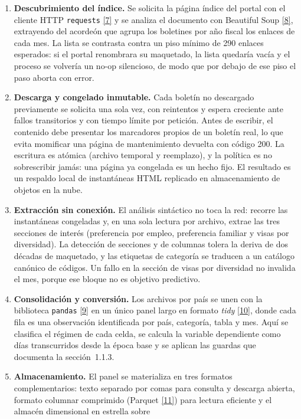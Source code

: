 \documentclass[12pt,letterpaper]{report}
\newcommand{\cita}[1]{\hyperref[bib:#1]{[#1]}}
\begin{document}
\begin{enumerate}[leftmargin=*]
\item \textbf{Descubrimiento del índice.} Se solicita la página índice del portal con el
cliente HTTP \texttt{requests} \cita{7} y se analiza el documento con Beautiful Soup
\cita{8}, extrayendo del acordeón que agrupa los boletines por año fiscal los enlaces de
cada mes. La lista se contrasta contra un piso mínimo de 290 enlaces esperados: si el portal
renombrara su maquetado, la lista quedaría vacía y el proceso se volvería un no-op
silencioso, de modo que por debajo de ese piso el paso aborta con error.
\item \textbf{Descarga y congelado inmutable.} Cada boletín no descargado previamente se
solicita una sola vez, con reintentos y espera creciente ante fallos transitorios y con
tiempo límite por petición. Antes de escribir, el contenido debe presentar los marcadores
propios de un boletín real, lo que evita momificar una página de mantenimiento devuelta con
código 200. La escritura es atómica (archivo temporal y reemplazo), y la política es no
sobrescribir jamás: una página ya congelada es un hecho fijo. El resultado es un respaldo
local de instantáneas HTML replicado en almacenamiento de objetos en la nube.
\item \textbf{Extracción sin conexión.} El análisis sintáctico no toca la red: recorre las
instantáneas congeladas y, en una sola lectura por archivo, extrae las tres secciones de
interés (preferencia por empleo, preferencia familiar y visas por diversidad). La detección
de secciones y de columnas tolera la deriva de dos décadas de maquetado, y las etiquetas de
categoría se traducen a un catálogo canónico de códigos. Un fallo en la sección de visas por
diversidad no invalida el mes, porque ese bloque no es objetivo predictivo.
\item \textbf{Consolidación y conversión.} Los archivos por país se unen con la biblioteca
\texttt{pandas} \cita{9} en un único panel largo en formato \textit{tidy}
\cita{10}, donde cada fila es una observación identificada por país, categoría, tabla y
mes. Aquí se clasifica el régimen de cada celda, se calcula la variable dependiente como
días transcurridos desde la época base y se aplican las guardas que documenta la
sección~1.1.3.
\item \textbf{Almacenamiento.} El panel se materializa en tres formatos complementarios:
texto separado por comas para consulta y descarga abierta, formato columnar comprimido
(Parquet \cita{11}) para lectura eficiente y el almacén dimensional en estrella sobre

\end{enumerate}
\end{document}

